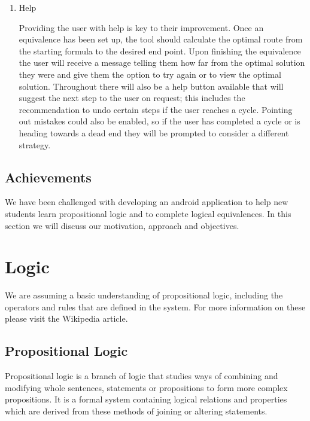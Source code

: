 \documentclass{report}
\begin{document}
\begin{enumerate}
\item Help

Providing the user with help is key to their improvement. Once an equivalence has been set up, the tool should calculate the optimal route from the starting formula to the desired end point. Upon finishing the equivalence the user will receive a message telling them how far from the optimal solution they were and give them the option to try again or to view the optimal solution. Throughout there will also be a help button available that will suggest the next step to the user on request; this includes the recommendation to undo certain steps if the user reaches a cycle. Pointing out mistakes could also be enabled, so if the user has completed a cycle or is heading towards a dead end they will be prompted to consider a different strategy.

\end{enumerate}

\section{Achievements}


We have been challenged with developing an android application to help new students learn propositional logic and to complete logical equivalences. In this section we will discuss our motivation, approach and objectives.

\chapter{Logic}

We are assuming a basic understanding of propositional logic, including the operators and rules that are defined in the system. For more information on these please visit the Wikipedia article\cite{propositionalwiki}.

\section{Propositional Logic}

Propositional logic is a branch of logic that studies ways of combining and modifying whole sentences, statements or propositions to form more complex propositions. It is a formal system containing logical relations and properties which are derived from these methods of joining or altering statements.
\end{document}
